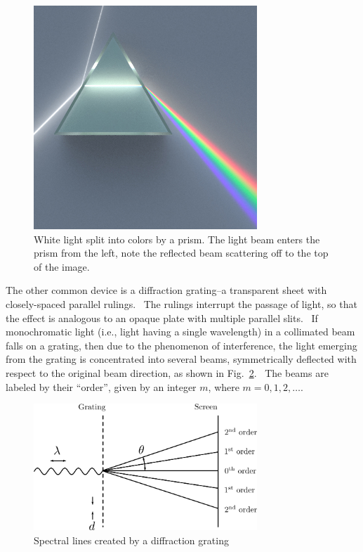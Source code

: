 \begin{figure}
\begin{centering}
 \includegraphics[width=0.75\textwidth]{../images/Dispersive_Prism.jpg} 
\caption{White light split into colors by a prism.  The light beam enters the prism from the left, note the reflected beam scattering off to the top of the image.}
\label{fig:prism}
\end{centering}
\end{figure}

The other common device is a diffraction grating--a transparent sheet
with closely-spaced parallel rulings. \ The rulings interrupt the
passage of light, so that the effect is analogous to an opaque plate
with multiple parallel slits. \ If monochromatic light (i.e., light
having a single wavelength) in a collimated beam falls on a grating,
then due to the phenomenon of interference, the light emerging from the
grating is concentrated into several beams, symmetrically deflected
with respect to the original beam direction, as shown in Fig.~\ref{fig:grating}. \ The
beams are labeled by their ``order'', given
by an integer $m$, where $m = 0,1,2,\ldots$.

\begin{figure}
\begin{centering}
\includegraphics[width=0.75\textwidth]{../images/grating-schematic.png} 
\caption{Spectral lines created by a diffraction grating}
\label{fig:grating}
\end{centering}
\end{figure}

